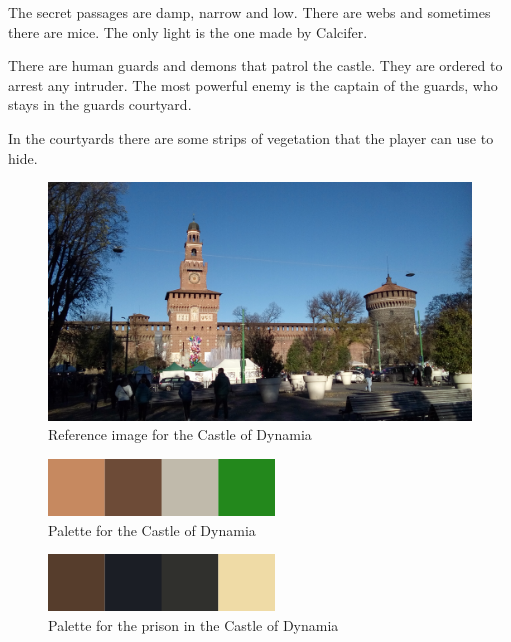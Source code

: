 The secret passages are damp, narrow and low. There are webs and sometimes there are mice. The only light is the one made by Calcifer.

There are human guards and demons that patrol the castle. They are ordered to arrest any intruder. The most powerful enemy is the captain of the guards, who stays in the guards courtyard.

In the courtyards there are some strips of vegetation that the player can use to hide.

\begin{figure}[H]
  \centering
  \includegraphics[width=\textwidth]{../../../References/Images/Dynamia/CastleOfDynamia/20181208_100357}
  \caption{Reference image for the Castle of Dynamia}
\end{figure}

\begin{figure}[H]
  \centering
  \includegraphics[width=6cm]{Images/Palettes/dynamiaCastle}
  \caption{Palette for the Castle of Dynamia}
\end{figure}

\begin{figure}[H]
  \centering
  \includegraphics[width=6cm]{Images/Palettes/dynamiaCastlePrison}
  \caption{Palette for the prison in the Castle of Dynamia}
\end{figure}

